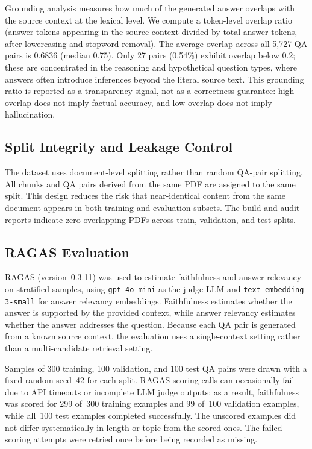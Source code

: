 \documentclass[conference]{IEEEtran}
\begin{document}
Grounding analysis measures how much of the generated answer overlaps with the source context at the lexical level. We compute a token-level overlap ratio (answer tokens appearing in the source context divided by total answer tokens, after lowercasing and stopword removal). The average overlap across all 5,727 QA pairs is 0.6836 (median 0.75). Only 27 pairs (0.54\%) exhibit overlap below 0.2; these are concentrated in the reasoning and hypothetical question types, where answers often introduce inferences beyond the literal source text. This grounding ratio is reported as a transparency signal, not as a correctness guarantee: high overlap does not imply factual accuracy, and low overlap does not imply hallucination.

\subsection{Split Integrity and Leakage Control}
The dataset uses document-level splitting rather than random QA-pair splitting. All chunks and QA pairs derived from the same PDF are assigned to the same split. This design reduces the risk that near-identical content from the same document appears in both training and evaluation subsets. The build and audit reports indicate zero overlapping PDFs across train, validation, and test splits.

\subsection{RAGAS Evaluation}
RAGAS (version~0.3.11) was used to estimate faithfulness and answer relevancy on stratified samples, using \texttt{gpt-4o-mini} as the judge LLM and \texttt{text-embedding-3-small} for answer relevancy embeddings. Faithfulness estimates whether the answer is supported by the provided context, while answer relevancy estimates whether the answer addresses the question. Because each QA pair is generated from a known source context, the evaluation uses a single-context setting rather than a multi-candidate retrieval setting.

Samples of 300 training, 100 validation, and 100 test QA pairs were drawn with a fixed random seed~42 for each split. RAGAS scoring calls can occasionally fail due to API timeouts or incomplete LLM judge outputs; as a result, faithfulness was scored for 299 of~300 training examples and 99 of~100 validation examples, while all~100 test examples completed successfully. The unscored examples did not differ systematically in length or topic from the scored ones. The failed scoring attempts were retried once before being recorded as missing.
\end{document}
